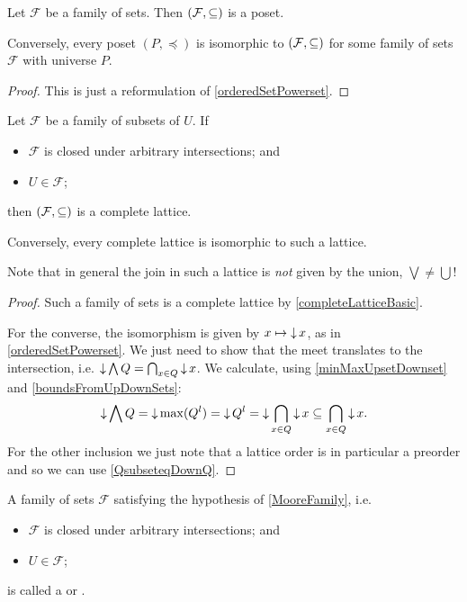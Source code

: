 \begin{proposition} \label{posetPowerset}
Let $\mathcal{F}$ be a family of sets. Then $\left( \mathcal{F}, \subseteq \right)$ is a poset.

Conversely, every poset $(P,\preceq)$ is isomorphic to $\left( \mathcal{F}, \subseteq \right)$ for some family of sets $\mathcal{F}$ with universe $P$.
\end{proposition}
\begin{proof}
This is just a reformulation of \ref{orderedSetPowerset}.
\end{proof}
\begin{corollary} \label{MooreFamily}
Let $\mathcal{F}$ be a family of subsets of $U$. If
\begin{itemize}
\item $\mathcal{F}$ is closed under arbitrary intersections; and
\item $U \in \mathcal{F}$;
\end{itemize}
then $\left( \mathcal{F},\subseteq \right)$ is a complete lattice.

Conversely, every complete lattice is isomorphic to such a lattice.
\end{corollary}
Note that in general the join in such a lattice is \emph{not} given by the union, $\bigvee \neq \bigcup$!
\begin{proof}
Such a family of sets is a complete lattice by \ref{completeLatticeBasic}.

For the converse, the isomorphism is given by $x\mapsto \mathop{\downarrow} x$, as in \ref{orderedSetPowerset}. We just need to show that the meet translates to the intersection, i.e. $\mathop{\downarrow} \bigwedge Q = \bigcap_{x\in Q}\mathop{\downarrow} x$. We calculate, using \ref{minMaxUpsetDownset} and \ref{boundsFromUpDownSets}:
\[ \mathop{\downarrow} \bigwedge Q = \mathop{\downarrow} \max(Q^l) = \mathop{\downarrow} Q^l = \mathop{\downarrow} \bigcap_{x\in Q} \mathop{\downarrow} x \subseteq \bigcap_{x\in Q} \mathop{\downarrow} x. \]
For the other inclusion we just note that a lattice order is in particular a  preorder and so we can use \ref{QsubseteqDownQ}.
\end{proof}

\begin{definition}
A family of sets $\mathcal{F}$ satisfying the hypothesis of \ref{MooreFamily}, i.e.
\begin{itemize}
\item $\mathcal{F}$ is closed under arbitrary intersections; and
\item $U \in \mathcal{F}$;
\end{itemize}
is called a  or .
\end{definition}


